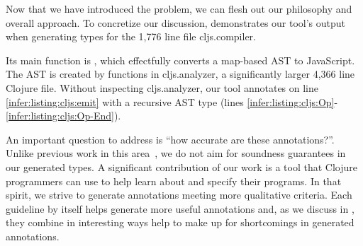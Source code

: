 \label{infer:sec:overview}

Now that we have introduced the problem,
we can flesh out our philosophy and overall
approach. To concretize our discussion,
 demonstrates our tool's output
when generating types for the 1,776 line file cljs.compiler.

Its main function is , which
effectfully converts a map-based AST
to JavaScript.
The AST is created by functions in cljs.analyzer,
a significantly larger 4,366 line Clojure file.
Without inspecting cljs.analyzer,
our tool annotates  on line \ref{infer:listing:cljs:emit}
with a recursive AST type  (lines \ref{infer:listing:cljs:Op}-\ref{infer:listing:cljs:Op-End}).

%




An important question to address is ``how accurate are these annotations?''.
Unlike previous work in this area~\cite{An10dynamicinference}, we do not aim for soundness guarantees
in our generated types. 
A significant contribution of our work is a tool that Clojure programmers
can use to help learn about and specify their programs.
In that spirit, we strive to generate annotations meeting more qualitative criteria.
Each guideline by itself helps generate more useful annotations and,
as we discuss in ,
they combine in interesting ways help to make up for shortcomings
in generated annotations.

